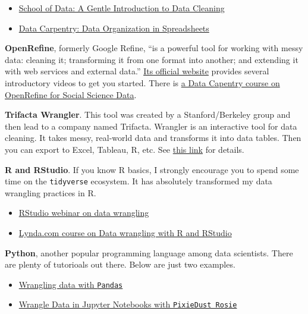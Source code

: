 \documentclass[
]{book}
\providecommand{\tightlist}{%
  \setlength{\itemsep}{0pt}\setlength{\parskip}{0pt}}
\begin{document}
\begin{itemize}
\tightlist
\item
  \href{https://schoolofdata.org/courses/\#IntroDataCleaning}{School of Data: A Gentle Introduction to Data Cleaning}
\item
  \href{http://www.datacarpentry.org/spreadsheet-ecology-lesson/}{Data Carpentry: Data Organization in Spreadsheets}
\end{itemize}

\textbf{OpenRefine}, formerly Google Refine, ``is a powerful tool for working with messy data: cleaning it; transforming it from one format into another; and extending it with web services and external data.'' \href{http://openrefine.org/}{Its official website} provides several introductory videos to get you started. There is \href{https://datacarpentry.org/openrefine-socialsci/}{a Data Capentry course on OpenRefine for Social Science Data}.

\textbf{Trifacta Wrangler}. This tool was created by a Stanford/Berkeley group and then lead to a company named Trifacta. Wrangler is an interactive tool for data cleaning. It takes messy, real-world data and transforms it into data tables. Then you can export to Excel, Tableau, R, etc. See \href{https://www.trifacta.com/data-wrangling/}{this link} for details.

\textbf{R and RStudio}. If you know R basics, I strongly encourage you to spend some time on the \texttt{tidyverse} ecosystem. It has absolutely transformed my data wrangling practices in R.

\begin{itemize}
\tightlist
\item
  \href{https://www.rstudio.com/resources/webinars/data-wrangling-with-r-and-rstudio/}{RStudio webinar on data wrangling}
\item
  \href{https://www.lynda.com/R-tutorials/Data-Wrangling-R/594442-2.html}{Lynda.com course on Data wrangling with R and RStudio}
\end{itemize}

\textbf{Python}, another popular programming language among data scientists. There are plenty of tutorioals out there. Below are just two examples.

\begin{itemize}
\tightlist
\item
  \href{https://towardsdatascience.com/wrangling-data-with-pandas-27ef828aff01}{Wrangling data with \texttt{Pandas}}
\item
  \href{https://medium.com/ibm-watson-data-lab/wrangle-data-in-jupyter-notebooks-with-pixiedust-rosie-7d9ac1129925}{Wrangle Data in Jupyter Notebooks with \texttt{PixieDust\ Rosie}}
\end{itemize}
\end{document}
